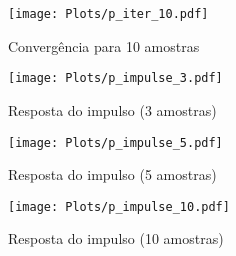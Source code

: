\begin{figure}[H]
	\begin{center}	
		\texttt{[image: Plots/p\_iter\_10.pdf]}
		\caption{Convergência para 10 amostras}
		\label{fig:p_iter_10}
	\end{center}
\end{figure}



\begin{figure}[H]
	\begin{center}	
		\texttt{[image: Plots/p\_impulse\_3.pdf]}
		\caption{Resposta do impulso (3 amostras)}
		\label{fig:p_impulse_3}
	\end{center}
\end{figure}

\begin{figure}[H]
	\begin{center}	
		\texttt{[image: Plots/p\_impulse\_5.pdf]}
		\caption{Resposta do impulso (5 amostras)}
		\label{fig:p_impulse_5}
	\end{center}
\end{figure}

\begin{figure}[H]
	\begin{center}	
		\texttt{[image: Plots/p\_impulse\_10.pdf]}
		\caption{Resposta do impulso (10 amostras)}
		\label{fig:p_impulse_10}
	\end{center}
\end{figure}
\onecolumn
\newpage

